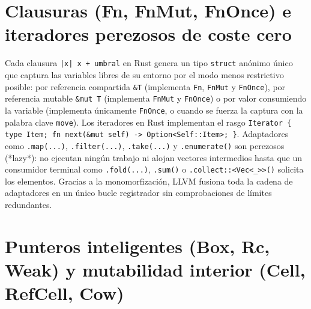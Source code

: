 \documentclass{book}
\begin{document}
\section{Clausuras (Fn, FnMut, FnOnce) e iteradores perezosos de coste cero}

Cada clausura \texttt{|x| x + umbral} en Rust genera un tipo \texttt{struct} anónimo único que captura las variables libres de su entorno por el modo menos restrictivo posible: por referencia compartida \texttt{\&T} (implementa \texttt{Fn}, \texttt{FnMut} y \texttt{FnOnce}), por referencia mutable \texttt{\&mut T} (implementa \texttt{FnMut} y \texttt{FnOnce}) o por valor consumiendo la variable (implementa únicamente \texttt{FnOnce}, o cuando se fuerza la captura con la palabra clave \texttt{move}). Los iteradores en Rust implementan el rasgo \texttt{Iterator \{ type Item; fn next(\&mut self) -> Option<Self::Item>; \}}. Adaptadores como \texttt{.map(...)}, \texttt{.filter(...)}, \texttt{.take(...)} y \texttt{.enumerate()} son perezosos (*lazy*): no ejecutan ningún trabajo ni alojan vectores intermedios hasta que un consumidor terminal como \texttt{.fold(...)}, \texttt{.sum()} o \texttt{.collect::<Vec<\_>>()} solicita los elementos. Gracias a la monomorfización, LLVM fusiona toda la cadena de adaptadores en un único bucle registrador sin comprobaciones de límites redundantes.

\section{Punteros inteligentes (Box, Rc, Weak) y mutabilidad interior (Cell, RefCell, Cow)}
\end{document}
